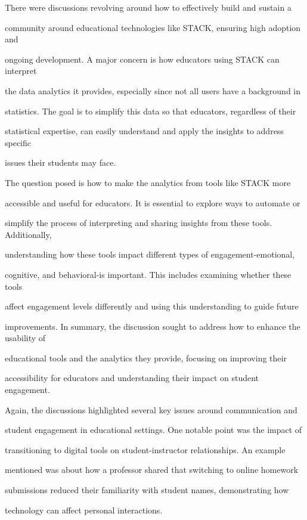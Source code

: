 \documentclass[11pt]{article}
\begin{document}
There were discussions revolving around how to effectively build and sustain a

community around educational technologies like STACK, ensuring high adoption and

ongoing development. A major concern is how educators using STACK can interpret

the data analytics it provides, especially since not all users have a background in

statistics. The goal is to simplify this data so that educators, regardless of their

statistical expertise, can easily understand and apply the insights to address specific

issues their students may face.

The question posed is how to make the analytics from tools like STACK more

accessible and useful for educators. It is essential to explore ways to automate or

simplify the process of interpreting and sharing insights from these tools. Additionally,

understanding how these tools impact different types of engagement-emotional,

cognitive, and behavioral-is important. This includes examining whether these tools

affect engagement levels differently and using this understanding to guide future

improvements. In summary, the discussion sought to address how to enhance the usability of

educational tools and the analytics they provide, focusing on improving their

accessibility for educators and understanding their impact on student engagement.

Again, the discussions highlighted several key issues around communication and

student engagement in educational settings. One notable point was the impact of

transitioning to digital tools on student-instructor relationships. An example

mentioned was about how a professor shared that switching to online homework

submissions reduced their familiarity with student names, demonstrating how

technology can affect personal interactions.
\end{document}
